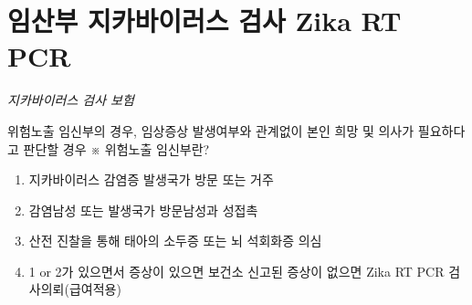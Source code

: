 \section{임산부 지카바이러스 검사 Zika RT PCR}
{
\emph{지카바이러스 검사 보험}\par
위험노출 임신부의 경우, 임상증상 발생여부와 관계없이 본인 희망 및 의사가 필요하다고 판단할 경우 ※ 위험노출 임신부란?
\begin{enumerate}[①]\tightlist
\item 지카바이러스 감염증 발생국가 방문 또는 거주
\item 감염남성 또는 발생국가 방문남성과 성접촉
\item 산전 진찰을 통해 태아의 소두증 또는 뇌 석회화증 의심
\item 1 or 2가 있으면서 증상이 있으면 보건소 신고된 증상이 없으면 Zika RT PCR 검사의뢰(급여적용)
\end{enumerate}
}
\prezi{\clearpage}

